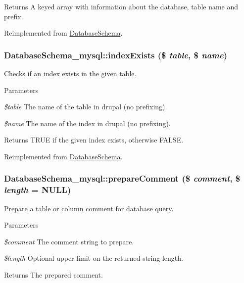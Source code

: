 \begin{DoxyReturn}{Returns}
A keyed array with information about the database, table name and prefix. 
\end{DoxyReturn}


Reimplemented from \hyperlink{classDatabaseSchema_a8acae6a4bd3e5ba89aaddc8133927ee2}{DatabaseSchema}.\hypertarget{classDatabaseSchema__mysql_aeef6ccd88482787cdbb4ff4e65bed2dd}{
\subsubsection[{indexExists}]{\setlength{\rightskip}{0pt plus 5cm}DatabaseSchema\_\-mysql::indexExists (\$ {\em table}, \/  \$ {\em name})}}
\label{classDatabaseSchema__mysql_aeef6ccd88482787cdbb4ff4e65bed2dd}
Checks if an index exists in the given table.


\begin{DoxyParams}{Parameters}
\item[{\em \$table}]The name of the table in drupal (no prefixing). \item[{\em \$name}]The name of the index in drupal (no prefixing).\end{DoxyParams}
\begin{DoxyReturn}{Returns}
TRUE if the given index exists, otherwise FALSE. 
\end{DoxyReturn}


Reimplemented from \hyperlink{classDatabaseSchema_ae343d2fd453d51d9df43d439af0a22e2}{DatabaseSchema}.\hypertarget{classDatabaseSchema__mysql_a3769228a1a4831bc1dd75d9d4c5802dc}{
\subsubsection[{prepareComment}]{\setlength{\rightskip}{0pt plus 5cm}DatabaseSchema\_\-mysql::prepareComment (\$ {\em comment}, \/  \$ {\em length} = {\ttfamily NULL})}}
\label{classDatabaseSchema__mysql_a3769228a1a4831bc1dd75d9d4c5802dc}
Prepare a table or column comment for database query.


\begin{DoxyParams}{Parameters}
\item[{\em \$comment}]The comment string to prepare. \item[{\em \$length}]Optional upper limit on the returned string length.\end{DoxyParams}
\begin{DoxyReturn}{Returns}
The prepared comment. 
\end{DoxyReturn}


